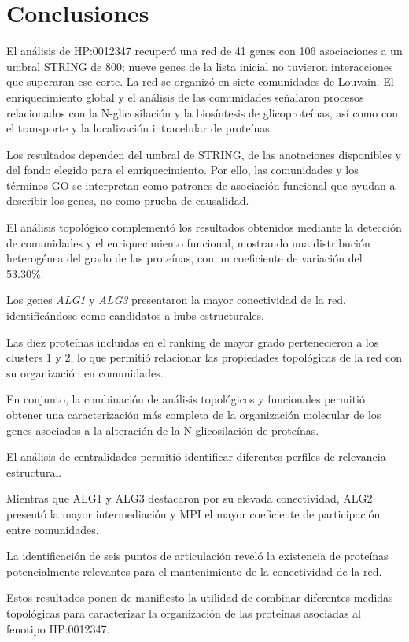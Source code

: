 \section{Conclusiones}

El análisis de HP:0012347 recuperó una red de 41 genes con 106 asociaciones a un umbral STRING de 800; nueve genes de la lista inicial no tuvieron interacciones que superaran ese corte. La red se organizó en siete comunidades de Louvain. El enriquecimiento global y el análisis de las comunidades señalaron procesos relacionados con la N-glicosilación y la biosíntesis de glicoproteínas, así como con el transporte y la localización intracelular de proteínas.

Los resultados dependen del umbral de STRING, de las anotaciones disponibles y del fondo elegido para el enriquecimiento. Por ello, las comunidades y los términos GO se interpretan como patrones de asociación funcional que ayudan a describir los genes, no como prueba de causalidad.

El análisis topológico complementó los resultados
obtenidos mediante la detección de comunidades y
el enriquecimiento funcional, mostrando una
distribución heterogénea del grado de las proteínas,
con un coeficiente de variación del 53.30\%.

Los genes \textit{ALG1} y \textit{ALG3} presentaron
la mayor conectividad de la red, identificándose
como candidatos a hubs estructurales.

Las diez proteínas incluidas en el ranking de mayor
grado pertenecieron a los clusters 1 y 2, lo que
permitió relacionar las propiedades topológicas de
la red con su organización en comunidades.

En conjunto, la combinación de análisis topológicos
y funcionales permitió obtener una caracterización
más completa de la organización molecular de los
genes asociados a la alteración de la N-glicosilación
de proteínas.

El análisis de centralidades permitió identificar
diferentes perfiles de relevancia estructural.

Mientras que ALG1 y ALG3 destacaron por su elevada
conectividad, ALG2 presentó la mayor intermediación
y MPI el mayor coeficiente de participación entre
comunidades.

La identificación de seis puntos de articulación
reveló la existencia de proteínas potencialmente
relevantes para el mantenimiento de la conectividad
de la red.

Estos resultados ponen de manifiesto la utilidad de
combinar diferentes medidas topológicas para
caracterizar la organización de las proteínas
asociadas al fenotipo HP:0012347.
